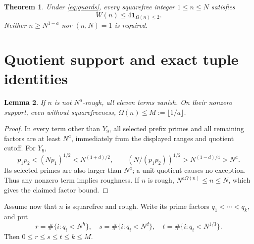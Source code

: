 \documentclass[11pt]{article}
\newtheorem{theorem}{Theorem}
\newtheorem{lemma}[theorem]{Lemma}
\newcommand{\ind}{\mathbf 1}
\newcommand{\Om}{\Omega}
\begin{document}
\begin{theorem}\label{thm:pointwise}
Under \eqref{eq:guards}, every squarefree integer $1\le n\le N$ satisfies
\[
                  W(n)\le4\ind_{\Om(n)\le2}.
\]
Neither $n\ge N^{1-a}$ nor $(n,N)=1$ is required.
\end{theorem}

\section{Quotient support and exact tuple identities}
\begin{lemma}\label{lem:rough}
If $n$ is not $N^a$-rough, all eleven terms vanish. On their nonzero
support, even without squarefreeness, $\Om(n)\le M:=\lfloor1/a\rfloor$.
\end{lemma}
\begin{proof}
In every term other than $Y_9$, all selected prefix primes and all
remaining factors are at least $N^a$, immediately from the displayed
ranges and quotient cutoff. For $Y_9$,
\[
 p_1p_2<(Np_1)^{1/2}<N^{(1+d)/2},\qquad
 (N/(p_1p_2))^{1/2}>N^{(1-d)/4}>N^a.
\]
Its selected primes are also larger than $N^a$; a unit quotient causes
no exception. Thus any nonzero term implies roughness. If $n$ is rough,
$N^{a\Om(n)}\le n\le N$, which gives the claimed factor bound.
\end{proof}

Assume now that $n$ is squarefree and rough. Write its prime factors
$q_1<\cdots<q_k$, and put
\[
 r=\#\{i:q_i<N^h\},\quad s=\#\{i:q_i<N^d\},\quad
 t=\#\{i:q_i<N^{1/3}\}.
\]
Then $0\le r\le s\le t\le k\le M$.
\end{document}
